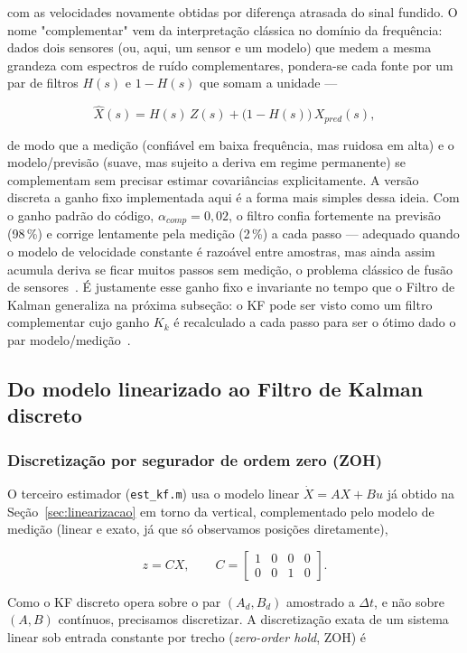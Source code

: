 \documentclass[brazil, 12pt]{article}
\begin{document}
com as velocidades novamente obtidas por diferença atrasada do sinal fundido.
O nome "complementar" vem da interpretação clássica no domínio da frequência:
dados dois sensores (ou, aqui, um
sensor e um modelo) que medem a mesma grandeza com espectros de ruído
complementares, pondera-se cada fonte por um par de filtros $H(s)$ e $1-H(s)$
que somam a unidade —

\[
\hat X(s) = H(s)\,Z(s) + \big(1-H(s)\big)\,X_{pred}(s),
\]

de modo que a medição (confiável em baixa frequência, mas ruidosa em alta) e o
modelo/previsão (suave, mas sujeito a deriva em regime permanente) se
complementam sem precisar estimar covariâncias explicitamente. A versão
discreta a ganho fixo implementada aqui é a forma mais simples dessa ideia.
Com o ganho padrão do código, $\alpha_{comp}=0{,}02$, o filtro confia
fortemente na previsão (98\,\%) e corrige lentamente pela medição (2\,\%) a
cada passo --- adequado quando o modelo de velocidade constante é razoável
entre amostras, mas ainda assim acumula deriva se ficar muitos passos sem
medição, o problema clássico de fusão de sensores~\cite{simon2006}. É
justamente esse ganho fixo e invariante no tempo que o Filtro de Kalman
generaliza na próxima subseção: o KF pode ser visto como um filtro
complementar cujo ganho $K_k$ é recalculado a cada passo para ser o ótimo
dado o par modelo/medição~\cite{simon2006}.

\subsection{Do modelo linearizado ao Filtro de Kalman discreto}
\label{sec:kf-linear}

\subsubsection{Discretização por segurador de ordem zero (ZOH)}
\label{sec:zoh}

O terceiro estimador (\texttt{est\_kf.m}) usa o modelo linear $\dot X = AX+Bu$
já obtido na Seção~\ref{sec:linearizacao} em torno da vertical, complementado
pelo modelo de medição (linear e exato, já que só observamos posições
diretamente),

\[
z = C X, \qquad
C = \begin{bmatrix} 1 & 0 & 0 & 0 \\ 0 & 0 & 1 & 0 \end{bmatrix}.
\]

Como o KF discreto opera sobre o par $(A_d, B_d)$ amostrado a $\Delta t$, e não
sobre $(A,B)$ contínuos, precisamos discretizar. A discretização exata de um
sistema linear sob entrada constante por trecho (\emph{zero-order hold}, ZOH) é
\end{document}
